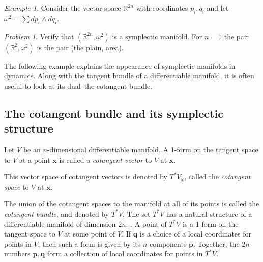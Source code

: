 \documentclass{book}
\numberwithin{equation}{section}
\theoremstyle{plain}
\theoremstyle{definition}
\theoremstyle{remark}
\theoremstyle{smallcap}
\newtheorem*{ex*}{Example}
\newtheorem*{prob*}{Problem}
\numberwithin{prob}{section}
\begin{document}
\begin{ex*}
  Consider the vector space $\mathbb R^{2n}$
  with coordinates $p_i, q_i$ and let
  $\omega^2 = \sum d p_i \wedge dq_i$.
\end{ex*}

\begin{prob*}
  Verify that $(\mathbb R^{2n}, \omega^2)$
  is a symplectic manifold.
  For $n = 1$ the pair $(\mathbb R^2, \omega^2)$
  is the pair (the plain, area).

\end{prob*}


The following example explains the appearance of symplectic manifolds
in dynamics.  Along with the tangent bundle of a differentiable manifold,
it is often useful to look at its dual--the cotangent bundle.

\subsection{The cotangent bundle and its symplectic structure}



Let $V$ be an $n$-dimensional differentiable manifold.
%
A 1-form on the tangent space to $V$ at a point $\mathbf x$ is called
a \emph{cotangent vector} to $V$ at $\mathbf x$.

This vector space of cotangent vectors is denoted by $T^*V_{\mathbf x}$,
called the \emph{cotangent space} to $V$ at $\mathbf x$.

The union of the cotangent spaces to the manifold at all of its points
is called the \emph{cotangent bundle}, and denoted by $T^*V$.
%
The set $T^*V$ has a natural structure of a differentiable manifold of
dimension $2 n$.
.
%
A point of $T^*V$ is a 1-form on the tangent space to $V$ at some point of $V$.
%
If $\mathbf q$ is a choice of a local coordinates for points in $V$,
then such a form is given by its $n$ components $\mathbf p$.
%
Together, the $2n$ numbers $\mathbf p, \mathbf q$ form a collection of local coordinates
for points in $T^*V$.
\end{document}
